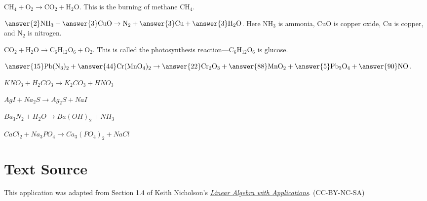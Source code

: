 \documentclass{ximera}
\begin{document}
\begin{problem}\label{chemeqn1}
$\mbox{CH}_{4} + \mbox{O}_2 \to \mbox{CO}_{2} + \mbox{H}_{2}\mbox{O}$. This is the burning of methane $\mbox{CH}_{4}$.
\end{problem}

\begin{problem}\label{chemeqn2}
$\answer{2}\mbox{NH}_{3} + \answer{3}\mbox{CuO} \to \mbox{N}_{2} + \answer{3}\mbox{Cu} + \answer{3}\mbox{H}_{2}\mbox{O}$. Here $\mbox{NH}_{3}$ is ammonia, $\mbox{CuO}$ is copper oxide, $\mbox{Cu}$ is copper, and $\mbox{N}_{2}$ is nitrogen.
\end{problem}

\begin{problem}\label{chemeqn3}
$\mbox{CO}_{2} + \mbox{H}_{2}\mbox{O} \to \mbox{C}_{6}\mbox{H}_{12}\mbox{O}_{6} + \mbox{O}_{2}$. This is called the photosynthesis reaction---$\mbox{C}_{6}\mbox{H}_{12}\mbox{O}_{6}$ is glucose.
\end{problem}

\begin{problem}\label{chemeqn4}
$\answer{15}\mbox{Pb}(\mbox{N}_{3})_{2} + \answer{44}\mbox{Cr}(\mbox{MnO}_{4})_{2} \to \answer{22}\mbox{Cr}_{2}\mbox{O}_{3} + \answer{88}\mbox{MnO}_{2} + \answer{5}\mbox{Pb}_{3}\mbox{O}_{4} + \answer{90}\mbox{NO}$.
\end{problem}

\begin{problem}\label{chemeqn5}
\item $KNO_{3}+H_{2}CO_{3}\rightarrow K_{2}CO_{3}+HNO_{3}$
\end{problem}

\begin{problem}\label{chemeqn6}
\item $AgI+Na_{2}S\rightarrow Ag_{2}S+NaI$
\end{problem}

\begin{problem}\label{chemeqn7}
\item $Ba_{3}N_{2}+H_{2}O\rightarrow Ba\left( OH\right) _{2}+NH_{3}$
\end{problem}

\begin{problem}\label{chemeqn8}
\item $CaCl_{2}+Na_{3}PO_{4}\rightarrow Ca_{3}\left( PO_{4}\right) _{2}+NaCl$
\end{problem}

\section*{Text Source} This application was adapted from Section 1.4 of Keith Nicholson's \href{https://open.umn.edu/opentextbooks/textbooks/linear-algebra-with-applications}{\it Linear Algebra with Applications}. (CC-BY-NC-SA)
\end{document}
